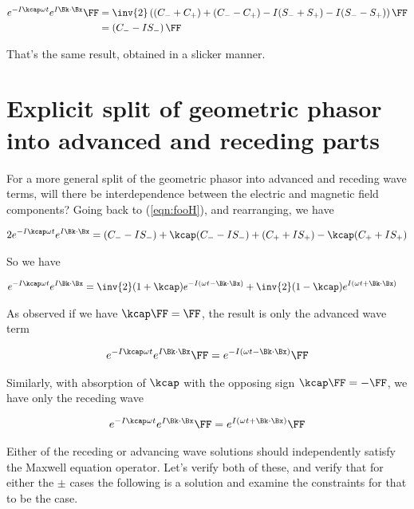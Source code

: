 \begin{align*}
e^{ -I \kcap \omega t } e^{ I \Bk \cdot \Bx } \FF
&=
\inv{2}
\left( 
(C_{-} + C_{+})
+(C_{-} - C_{+})
-I (S_{-} + S_{+})
-I (S_{-} - S_{+})
\right) \FF \\
&=
\left( C_{-} -I S_{-} \right) \FF
\end{align*}

That's the same result, obtained in a slicker manner.

\section{Explicit split of geometric phasor into advanced and receding parts}

For a more general split of the geometric phasor into advanced and receding wave terms, will there be interdependence between the electric and magnetic field components?   Going back to (\ref{eqn:fooH}), and rearranging, we have

\begin{align*}
2 e^{ -I \kcap \omega t } e^{ I \Bk \cdot \Bx }
&=
(C_{-} -I S_{-})
+\kcap (C_{-} -I S_{-} )
+(C_{+} +I S_{+})
-\kcap (C_{+} +I S_{+}) \\
\end{align*}

So we have

\begin{align}\label{eqn:fooJ}
e^{ -I \kcap \omega t } e^{ I \Bk \cdot \Bx }
&=
\inv{2}(1 + \kcap)e^{-I(\omega t - \Bk \cdot \Bx)}
+\inv{2}(1 - \kcap)e^{I(\omega t + \Bk \cdot \Bx)}
\end{align}

As observed if we have $\kcap \FF = \FF$, the result is only the advanced wave term

\begin{align*}
e^{ -I \kcap \omega t } e^{ I \Bk \cdot \Bx } \FF = e^{-I(\omega t - \Bk \cdot \Bx)} \FF
\end{align*}

Similarly, with absorption of $\kcap$ with the opposing sign $\kcap \FF = -\FF$, we have only the receding wave

\begin{align*}
e^{ -I \kcap \omega t } e^{ I \Bk \cdot \Bx } \FF = e^{I(\omega t + \Bk \cdot \Bx)} \FF
\end{align*}

Either of the receding or advancing wave solutions should independently satisfy the Maxwell equation operator.  Let's verify both of these, and verify that for either the $\pm$ cases the following is a solution and examine the constraints for that to be the case.

